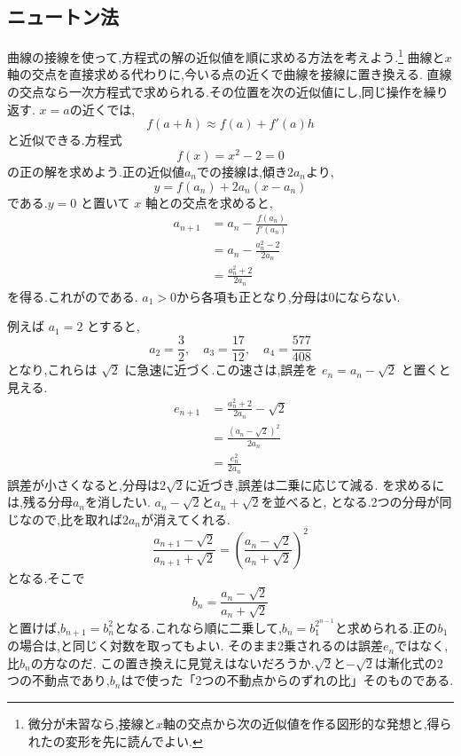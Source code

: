 \subsection{ニュートン法}\label{節：ニュートン法}

曲線の接線を使って,方程式の解の近似値を順に求める方法を考えよう.\footnote{微分が未習なら,接線と$x$軸の交点から次の近似値を作る図形的な発想と,得られたの変形を先に読んでよい.}
曲線と$x$軸の交点を直接求める代わりに,今いる点の近くで曲線を接線に置き換える.
直線の交点なら一次方程式で求められる.その位置を次の近似値にし,同じ操作を繰り返す.
$x=a$の近くでは,
\[
  f(a+h) \approx f(a)+f'(a)h
\]
と近似できる.方程式
\[
  f(x)=x^2-2=0
\]
の正の解を求めよう.正の近似値$a_n$での接線は,傾き$2a_n$より,
\[
  y=f(a_n)+2a_n(x-a_n)
\]
である.$y=0$ と置いて $x$ 軸との交点を求めると,
\begin{align*}
  a_{n+1}
  &=a_n-\frac{f(a_n)}{f'(a_n)}\\
  &=a_n-\frac{a_n^2-2}{2a_n}\\
  &=\frac{a_n^2+2}{2a_n}
\end{align*}
を得る.これがのである.
$a_1>0$から各項も正となり,分母は0にならない.
\BookFigNewton

例えば $a_1=2$ とすると,
\[
  a_2=\frac{3}{2},
  \quad
  a_3=\frac{17}{12},
  \quad
  a_4=\frac{577}{408}
\]
となり,これらは $\sqrt{2}$ に急速に近づく.この速さは,誤差を
$e_n=a_n-\sqrt{2}$ と置くと見える.
\begin{align*}
  e_{n+1}
  &=\frac{a_n^2+2}{2a_n}-\sqrt{2}\\
  &=\frac{(a_n-\sqrt{2})^2}{2a_n}\\
  &=\frac{e_n^2}{2a_n}
\end{align*}
誤差が小さくなると,分母は$2\sqrt2$に近づき,誤差は二乗に応じて減る.
を求めるには,残る分母$a_n$を消したい.
$a_n-\sqrt2$と$a_n+\sqrt2$を並べると,
\BookMathLayout{
  \[
    \begin{aligned}
      a_{n+1}-\sqrt2&=\frac{(a_n-\sqrt2)^2}{2a_n},\\
      a_{n+1}+\sqrt2&=\frac{(a_n+\sqrt2)^2}{2a_n}
    \end{aligned}
  \]
}{
  \[
    \begin{aligned}
      a_{n+1}-\sqrt2&=\frac{(a_n-\sqrt2)^2}{2a_n},\\
      a_{n+1}+\sqrt2&=\frac{(a_n+\sqrt2)^2}{2a_n}
    \end{aligned}
  \]
}
となる.2つの分母が同じなので,比を取れば$2a_n$が消えてくれる.
\[
  \frac{a_{n+1}-\sqrt{2}}{a_{n+1}+\sqrt{2}}
  =\left(\frac{a_n-\sqrt{2}}{a_n+\sqrt{2}}\right)^{2}
\]
となる.そこで
\[
  b_n=\frac{a_n-\sqrt{2}}{a_n+\sqrt{2}}
\]
と置けば,$b_{n+1}=b_n^2$となる.これなら順に二乗して,$b_n=b_1^{2^{n-1}}$と求められる.正の$b_1$の場合は,と同じく対数を取ってもよい.
そのまま2乗されるのは誤差$e_n$ではなく,比$b_n$の方なのだ.
この置き換えに見覚えはないだろうか.$\sqrt2$と$-\sqrt2$は漸化式の2つの不動点であり,$b_n$はで使った「2つの不動点からのずれの比」そのものである.

